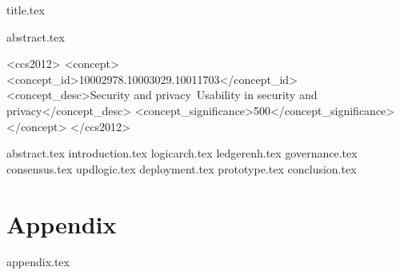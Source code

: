 \documentclass[sigconf, anonymous]{acmart}
\begin{document}
{title.tex}

{abstract.tex}


\begin{CCSXML}
<ccs2012>
<concept>
<concept_id>10002978.10003029.10011703</concept_id>
<concept_desc>Security and privacy~Usability in security and privacy</concept_desc>
<concept_significance>500</concept_significance>
</concept>
</ccs2012>
\end{CCSXML}



\maketitle


{abstract.tex}
{introduction.tex}
{logicarch.tex}
{ledgerenh.tex}
{governance.tex}
{consensus.tex}
{updlogic.tex}
{deployment.tex}
{prototype.tex}
{conclusion.tex}

\ifshort\else
\appendix
\section*{Appendix}
{appendix.tex}
\fi




\end{document}
